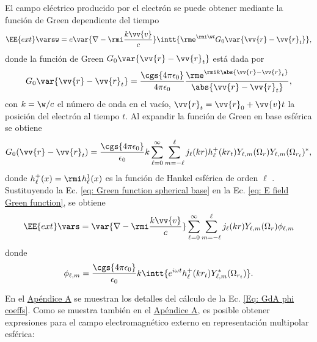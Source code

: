 El campo eléctrico producido por el electrón se puede obtener mediante la función de Green dependiente del tiempo \cite{maciel2019electromagnetic}  
\begin{equation}
\EE{ext}\varsw = e\var{\nabla-\rmi \frac{k\vv{v}}{c}} \intt{\rme^{\rmi \w t} G_0 \var{\vv{r}-\vv{r}_t}},
\label{eq: E field Green function}
\end{equation}
donde la función de Green $G_0 \var{\vv{r}-\vv{r}_t}$ está dada por 
\begin{equation}
G_0 \var{\vv{r}-\vv{r}_t} = \frac{\cgs{4\pi\epsilon_0}}{4\pi\epsilon_0}\frac{\rme^{\rmi k \abs{\vv{r}-\vv{r}_t}}}{\abs{\vv{r}-\vv{r}_t}},
\end{equation}
con $k = \w/c$ el número de onda en el vacío, $\vv{r}_t=\vv{r}_0+\vv{v}t$ la posición del electrón al tiempo $t$. Al expandir la función de Green en base esférica se obtiene \cite{de1999relativistic}
\begin{equation}
G_0(\vv{r}-\vv{r}_t) = \frac{\cgs{4\pi\epsilon_0}}{\epsilon_0} k \sum_{\ell = 0}^{\infty} \sum_{m=-\ell}^{\ell} j_{\ell}(kr) h_{\ell}^{+}(k r_t) Y_{\ell, m}(\Omega_r) Y_{\ell, m}(\Omega_{r_t})^{*},
\label{eq: Green function spherical base}
\end{equation}
donde $h_{\ell}^{+}(x) = \rmi h_{\ell}^{1}(x)$ es la función de Hankel esférica de orden $\ell$ \citep{Abramowitz}. Sustituyendo la Ec. \eqref{eq: Green function spherical base} en la Ec. \eqref{eq: E field Green function}, se obtiene
\begin{equation}
\EE{ext}\vars = \var{\nabla-\rmi \frac{k\vv{v}}{c}} \sum_{\ell = 0}^{\infty} \sum_{m=-\ell}^{\ell} j_{\ell}(kr) Y_{\ell, m}(\Omega_{r})\phi_{\ell, m}
\end{equation}
donde 
\begin{equation}
\phi_{\ell, m} = \frac{\cgs{4\pi\epsilon_0}}{\epsilon_0} k \intt{e^{i \omega t} h_{\ell}^{+}(k r_{t}) Y_{\ell, m}^{*}(\Omega_{r_t}) }.
\label{Eq: GdA phi coeffs}
\end{equation}

En el \hyperref[AppendixScalarPotentials]{Apéndice A} se muestran los detalles del cálculo de la Ec. \eqref{Eq: GdA phi coeffs}. Como se muestra también en el \hyperref[AppendixScalarPotentials]{Apéndice A}, es posible obtener expresiones para el campo electromagnético externo en representación multipolar esférica:



